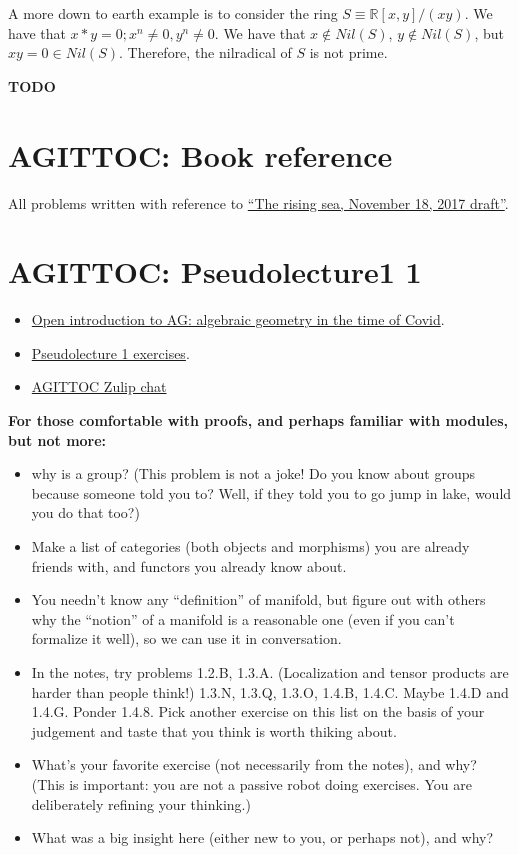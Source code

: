 \documentclass{book}
\theoremstyle{definition}
\begin{document}
A more down to earth example is to consider the ring $S \equiv \mathbb R[x, y] / (xy)$.
We have that $x * y = 0; x^n \neq 0, y^n \neq 0$. We have that $x \not \in Nil(S)$,
$y \not \in Nil(S)$, but $xy = 0 \in Nil(S)$. Therefore, the nilradical of $S$
is not prime.

\textbf{TODO}

\chapter{AGITTOC: Book reference}
All problems written with reference to
\href{https://math.stanford.edu/~vakil/216blog/FOAGnov1817public.pdf}{``The rising sea, November 18, 2017 draft''}.


\chapter{AGITTOC: Pseudolecture1 1}
\begin{itemize}
\item \href{https://math216.wordpress.com/agittoc-2020/}{Open introduction to AG: algebraic geometry in the time of Covid}.
\item \href{https://math216.wordpress.com/2020/06/27/discussion-for-this-week-starting-june-27-2020/}{Pseudolecture 1 exercises}.
\item \href{https://agittoc.zulipchat.com/}{AGITTOC Zulip chat}
\end{itemize}

\textbf{For those comfortable with proofs, and perhaps familiar with modules, but not more:}
\begin{itemize}
\item why is a group? (This problem is not a joke! Do you know about groups because someone told you to? Well, if they told you to go jump in lake, would you do that too?)
\item Make a list of categories (both objects and morphisms) you are already friends with, and functors you already know about.
\item You needn’t know any “definition” of manifold, but figure out with others why the “notion” of a manifold is a reasonable one (even if you can’t formalize it well), so we can use it in conversation.
\item In the notes, try problems 1.2.B, 1.3.A. (Localization and tensor products are harder than people think!) 1.3.N, 1.3.Q, 1.3.O, 1.4.B, 1.4.C. Maybe 1.4.D and 1.4.G. Ponder 1.4.8. Pick another exercise on this list on the basis of your judgement and taste that you think is worth thiking about.
\item What’s your favorite exercise (not necessarily from the notes), and why? (This is important: you are not a passive robot doing exercises. You are deliberately refining your thinking.)
\item What was a big insight here (either new to you, or perhaps not), and why?
\end{itemize}
\end{document}
